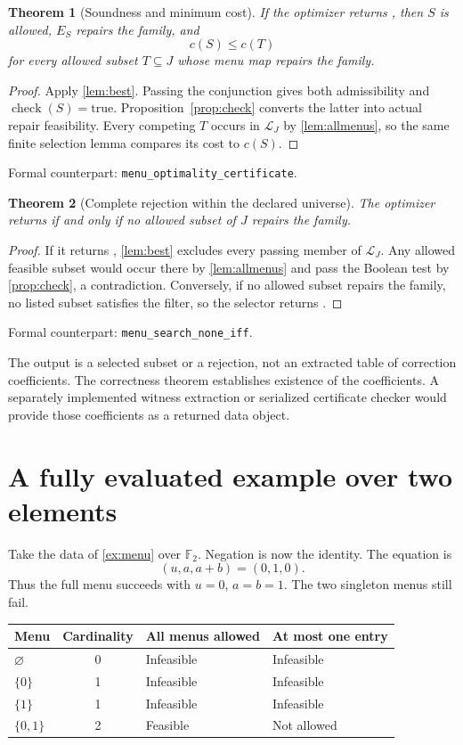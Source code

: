 \documentclass[11pt,letterpaper,oneside,openany]{book}
\theoremstyle{quiet}
\newtheorem{theorem}{Theorem}[chapter]
\newcommand{\F}{\mathbb{F}}
\newcommand{\code}[1]{\texttt{\detokenize{#1}}}
\newcommand{\formal}[1]{\par\nobreak\begingroup\footnotesize\color{Slate}\sffamily Formal counterpart: \normalfont\nolinkurl{#1}.\par\endgroup}
\begin{document}
\begin{theorem}[Soundness and minimum cost]\label{thm:optimizer}
If the optimizer returns \code{some S}, then $S$ is allowed, $E_S$ repairs the family, and
\[
c(S)\leq c(T)
\]
for every allowed subset $T\subseteq J$ whose menu map repairs the family.
\end{theorem}
\begin{proof}
Apply \cref{lem:best}. Passing the conjunction gives both admissibility and $\operatorname{check}(S)=\mathrm{true}$. Proposition~\ref{prop:check} converts the latter into actual repair feasibility. Every competing $T$ occurs in $\mathcal L_J$ by \cref{lem:allmenus}, so the same finite selection lemma compares its cost to $c(S)$.
\end{proof}
\formal{menu_optimality_certificate}

\begin{theorem}[Complete rejection within the declared universe]\label{thm:none}
The optimizer returns \code{none} if and only if no allowed subset of $J$ repairs the family.
\end{theorem}
\begin{proof}
If it returns \code{none}, \cref{lem:best} excludes every passing member of $\mathcal L_J$. Any allowed feasible subset would occur there by \cref{lem:allmenus} and pass the Boolean test by \cref{prop:check}, a contradiction. Conversely, if no allowed subset repairs the family, no listed subset satisfies the filter, so the selector returns \code{none}.
\end{proof}
\formal{menu_search_none_iff}

The output is a selected subset or a rejection, not an extracted table of correction coefficients. The correctness theorem establishes existence of the coefficients. A separately implemented witness extraction or serialized certificate checker would provide those coefficients as a returned data object.

\section{A fully evaluated example over two elements}\label{sec:f2}
Take the data of \cref{ex:menu} over $\F_2$. Negation is now the identity. The equation is
\[
(u,a,a+b)=(0,1,0).
\]
Thus the full menu succeeds with $u=0$, $a=b=1$. The two singleton menus still fail.

\begin{center}
\begin{tabular}{@{}lcll@{}}
\toprule
Menu & Cardinality & All menus allowed & At most one entry\\
\midrule
$\varnothing$ & 0 & Infeasible & Infeasible\\
$\{0\}$ & 1 & Infeasible & Infeasible\\
$\{1\}$ & 1 & Infeasible & Infeasible\\
$\{0,1\}$ & 2 & Feasible & Not allowed\\
\bottomrule
\end{tabular}
\end{center}
\end{document}
